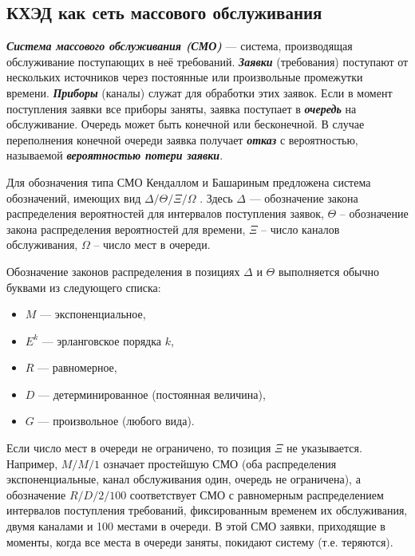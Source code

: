\subsection{КХЭД как сеть массового обслуживания} \label{net}

\textbf{\textit{Система массового обслуживания (СМО)}} --- система, производящая обслуживание поступающих в неё требований. \textbf{\textit{Заявки}} (требования) поступают от нескольких источников через постоянные или произвольные промежутки времени. \textbf{\textit{Приборы}} (каналы) служат для обработки этих заявок. Если в момент поступления заявки все приборы заняты, заявка поступает в \textbf{\textit{очередь}} на обслуживание. Очередь может быть конечной или бесконечной. В случае переполнения конечной очереди заявка получает \textbf{\textit{отказ}} с вероятностью, называемой \textbf{\textit{вероятностью потери заявки}}.

\vspace{\baselineskip}
Для обозначения типа СМО Кендаллом и Башариным предложена система обозначений, имеющих вид $\Delta / \Theta / \Xi / \Omega$ \cite{basharinq,basharin-models,basharin-sb}. Здесь $\Delta$ --- обозначение закона распределения вероятностей для интервалов поступления заявок, $\Theta$ – обозначение закона распределения вероятностей для времени, $\Xi$ – число каналов обслуживания, $\Omega$ – число мест в очереди.

\vspace{\baselineskip}
Обозначение законов распределения в позициях $\Delta$ и $\Theta$ выполняется обычно буквами из следующего списка:

\begin{itemize}
  \item $M$ --- экспоненциальное,
  \item $E^k$ --- эрланговское порядка $k$,
  \item $R$ --- равномерное,
  \item $D$ --- детерминированное (постоянная величина),
  \item $G$ --- произвольное (любого вида).
\end{itemize}

Если число мест в очереди не ограничено, то позиция $\Xi$ не указывается.
Например, $M/M/1$ означает простейшую СМО (оба распределения экспоненциальные, канал обслуживания один, очередь не ограничена), а обозначение $R/D/2/100$ соответствует СМО с равномерным распределением интервалов поступления требований, фиксированным временем их обслуживания, двумя каналами и 100 местами в очереди. В этой СМО заявки, приходящие в моменты, когда все места в очереди заняты, покидают систему (т.е. теряются).

